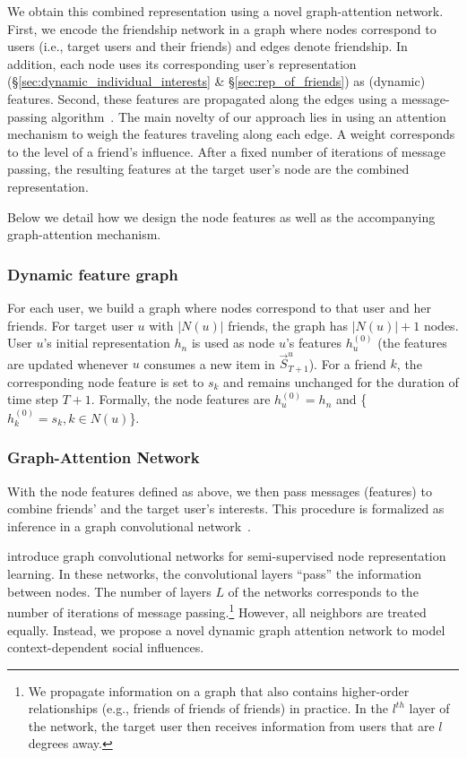 \documentclass[sigconf]{acmart}
\begin{document}
We obtain this combined representation using a novel graph-attention network. 
First, we encode the friendship network in a graph where nodes correspond to users (i.e., target users and their friends) and edges denote friendship. In addition, each node uses its corresponding user's representation (\S \ref{sec:dynamic_individual_interests} \& \S\ref{sec:rep_of_friends}) as (dynamic) features. Second, these features are propagated along the edges using a message-passing algorithm~\cite{gilmer2017neural}. The main novelty of our approach lies in using an attention mechanism to weigh the features traveling along each edge. A weight corresponds to the level of a friend's influence. After a fixed number of iterations of message passing, the resulting features at the target user's node are the combined representation. 

Below we detail how we design the node features as well as the accompanying graph-attention mechanism. 


\subsubsection{Dynamic feature graph}
For each user, we build a graph where nodes correspond to that user and her friends. For target user $u$ with $|N(u)|$ friends, the graph has $|N(u)|+1$ nodes. User $u$'s initial representation $h_n$ is used as node $u$'s features $h_u^{(0)}$ (the features are updated whenever $u$ consumes a new item in $\vec{S}_{T+1}^u$).
For a friend $k$, the corresponding node feature is set to $s_k$ and remains unchanged for the duration of time step $T+1$. Formally, the node features are $h_u^{(0)}=h_n$ and \{$h_{k}^{(0)} = s_k, k\in{N(u)}$\}.


\subsubsection{Graph-Attention Network} With the node features defined as above, we then pass messages (features) to combine friends' and the target user's interests. This procedure is formalized as inference in a graph convolutional network~\cite{kipf2016semi}. 

\citet{kipf2016semi} introduce graph convolutional networks for semi-supervised node representation learning. In these networks, the convolutional layers ``pass'' the information between nodes. The number of layers $L$ of the networks corresponds to the number of iterations of message passing.\footnote{We propagate information on a graph that also contains higher-order relationships (e.g., friends of friends of friends) in practice. In the $l^{th}$ layer of the network, the target user then receives information from users that are $l$ degrees away.}
However, all neighbors are treated equally.
Instead, we propose a novel dynamic graph attention network to model context-dependent social influences.
\end{document}
